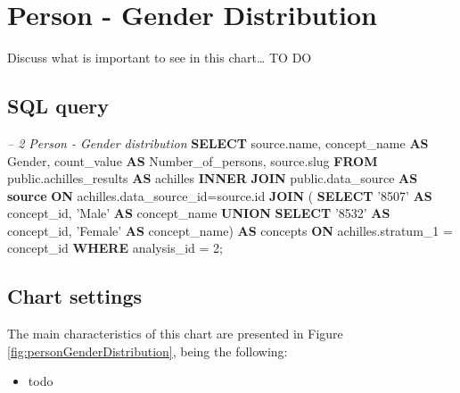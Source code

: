 \documentclass[]{book}
\newenvironment{Shaded}{\begin{snugshade}}{\end{snugshade}}
\newcommand{\KeywordTok}[1]{\textcolor[rgb]{0.13,0.29,0.53}{\textbf{#1}}}
\newcommand{\DecValTok}[1]{\textcolor[rgb]{0.00,0.00,0.81}{#1}}
\newcommand{\StringTok}[1]{\textcolor[rgb]{0.31,0.60,0.02}{#1}}
\newcommand{\CommentTok}[1]{\textcolor[rgb]{0.56,0.35,0.01}{\textit{#1}}}
\newcommand{\NormalTok}[1]{#1}
\providecommand{\tightlist}{%
  \setlength{\itemsep}{0pt}\setlength{\parskip}{0pt}}
\begin{document}
\section{Person - Gender
Distribution}\label{person---gender-distribution}

Discuss what is important to see in this chart\ldots{} TO DO

\subsection{SQL query}\label{sql-query-9}

\begin{Shaded}
\begin{Highlighting}[]
\CommentTok{-- 2  Person - Gender distribution}
\KeywordTok{SELECT}\NormalTok{ source.name,}
\NormalTok{       concept_name }\KeywordTok{AS}\NormalTok{ Gender, }
\NormalTok{       count_value }\KeywordTok{AS}\NormalTok{ Number_of_persons,}
\NormalTok{       source.slug}
\KeywordTok{FROM}\NormalTok{ public.achilles_results }\KeywordTok{AS}\NormalTok{ achilles }\KeywordTok{INNER} \KeywordTok{JOIN} 
\NormalTok{    public.data_source }\KeywordTok{AS} \KeywordTok{source} \KeywordTok{ON}\NormalTok{ achilles.data_source_id=source.id}
    \KeywordTok{JOIN}\NormalTok{ (}
        \KeywordTok{SELECT} \StringTok{'8507'} \KeywordTok{AS}\NormalTok{ concept_id, }\StringTok{'Male'} \KeywordTok{AS}\NormalTok{ concept_name }\KeywordTok{UNION} 
        \KeywordTok{SELECT} \StringTok{'8532'} \KeywordTok{AS}\NormalTok{ concept_id, }\StringTok{'Female'} \KeywordTok{AS}\NormalTok{ concept_name) }\KeywordTok{AS} 
\NormalTok{        concepts }\KeywordTok{ON}\NormalTok{ achilles.stratum_1 = concept_id}
\KeywordTok{WHERE}\NormalTok{ analysis_id = }\DecValTok{2}\NormalTok{;}
\end{Highlighting}
\end{Shaded}

\subsection{Chart settings}\label{chart-settings-9}

The main characteristics of this chart are presented in Figure
\ref{fig:personGenderDistribution}, being the following:

\begin{itemize}
\tightlist
\item
  todo
\end{itemize}
\end{document}
